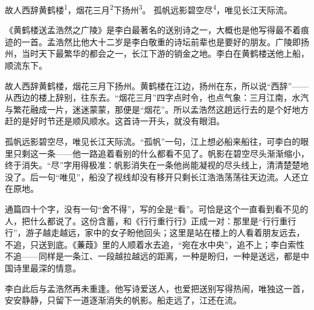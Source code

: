 
\begin{poem}
故人西辞黄鹤楼\textsuperscript{1}，烟花三月\textsuperscript{2}下扬州\textsuperscript{3}。
孤帆远影碧空尽\textsuperscript{4}，唯见长江天际流。
\end{poem}

\begin{annotations}
\end{annotations}

\begin{appreciation}
《黄鹤楼送孟浩然之广陵》是李白最著名的送别诗之一，大概也是他写得最不着痕迹的一首。孟浩然比他大十二岁是李白敬重的诗坛前辈也是要好的朋友。广陵即扬州，当时天下最繁华的都会之一，长江下游的销金之地。李白在黄鹤楼送他上船，顺流东下。

故人西辞黄鹤楼，烟花三月下扬州。黄鹤楼在江边，扬州在东，所以说“西辞”——从西边的楼上辞别，往东去。“烟花三月”四字点时令，也点气象：三月江南，水汽与繁花融成一片，迷迷蒙蒙，那便是“烟花”。所以孟浩然这趟远行去的是个好地方赶的是好时节还是顺风顺水。这首诗一开头，就没有眼泪。

孤帆远影碧空尽，唯见长江天际流。“孤帆”一句，江上想必船来船往，可李白的眼里只剩这一条——他一路追着看别的什么都看不见了。帆影在碧空尽头渐渐缩小，终于消失。“尽”字用得极准：帆影消失在一条他尚能凝视的尽头线上，清清楚楚地没了。后一句“唯见”，船没了视线却没有移开只剩长江浩浩荡荡往天边流。人还立在原地。

通篇四十个字，没有一句“舍不得”，写的全是“看”。可恰是这个一直看到看不见的人，把什么都说了。这份含蓄，和《行行重行行》正成一对：那里是“行行重行行”，游子越走越远，家中的女子盼他回头；这里是站在楼上的人看着朋友远去，不追，只送到底。《蒹葭》里的人顺着水去追，“宛在水中央”，追不上；李白索性不追——同样是一条江、一段越拉越远的距离，一种是盼归，一种是送远，都是中国诗里最深的情意。

李白此后与孟浩然再未重逢。他写诗爱送人，也爱把送别写得热闹，唯独这一首，安安静静，只留下一道逐渐消失的帆影。船走远了，江还在流。
\end{appreciation}
